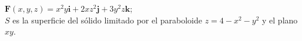 \item $\mathbf{F}(x, y, z) = x^2y\mathbf{i} + 2xz^2\mathbf{j} + 3y^2z\mathbf{k}$;\\
    $S$ es la superficie del sólido limitado por el paraboloide $z = 4 - x^2 - y^2$ y el plano $xy$.
